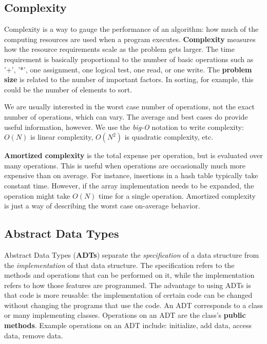 \subsection{Complexity}

Complexity is a way to gauge the performance of an algorithm: how much of the computing resources are used when a program executes. \textbf{Complexity} measures how the resource requirements scale as the problem gets larger. The time requirement is basically proportional to the number of basic operations such as '+', '*', one assignment, one logical test, one read, or one write. The \textbf{problem size} is related to the number of important factors. In sorting, for example, this could be the number of elements to sort. 

We are usually interested in the worst case number of operations, not the exact number of operations, which can vary. The average and best cases do provide useful information, however. We use the \textit{big-O} notation to write complexity: $O(N)$ is linear complexity, $O(N^{2})$ is quadratic complexity, etc. 

\textbf{Amortized complexity} is the total expense per operation, but is evaluated over many operations. This is useful when operations are occasionally much more expensive than on average. For instance, insertions in a hash table typically take constant time. However, if the array implementation needs to be expanded, the operation might take $O(N)$ time for a single operation. Amortized complexity is just a way of describing the worst case on-average behavior. 

\subsection{Abstract Data Types}

Abstract Data Types (\textbf{ADTs}) separate the \textit{specification} of a data structure from the \textit{implementation} of that data structure. The specification refers to the methods and operations that can be performed on it, while the implementation refers to how those features are programmed. The advantage to using ADTs is that code is more reusable: the implementation of certain code can be changed without changing the programs that use the code. An ADT corresponds to a class or many implementing classes. Operations on an ADT are the class's \textbf{public methods}. Example operations on an ADT include: initialize, add data, access data, remove data.

